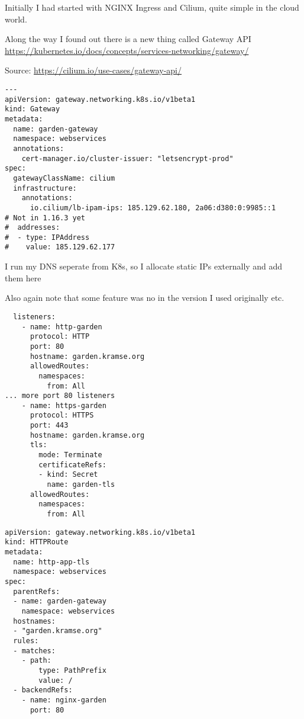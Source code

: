 \documentclass[Screen16to9,17pt]{foils}
\begin{document}

Initially I had started with NGINX Ingress and Cilium, quite simple in the cloud world.


Along the way I found out there is a new thing called Gateway API\\
 \url{https://kubernetes.io/docs/concepts/services-networking/gateway/}

Source: \url{https://cilium.io/use-cases/gateway-api/}

\begin{verbatim}
---
apiVersion: gateway.networking.k8s.io/v1beta1
kind: Gateway
metadata:
  name: garden-gateway
  namespace: webservices
  annotations:
    cert-manager.io/cluster-issuer: "letsencrypt-prod"
spec:
  gatewayClassName: cilium
  infrastructure:
    annotations:
      io.cilium/lb-ipam-ips: 185.129.62.180, 2a06:d380:0:9985::1
# Not in 1.16.3 yet
#  addresses:
#  - type: IPAddress
#    value: 185.129.62.177
\end{verbatim}

\begin{list2}
\item I run my DNS seperate from K8s, so I allocate static IPs externally and add them here
\item Also again note that some feature was no in the version I used originally etc.
\end{list2}

\begin{verbatim}
  listeners:
    - name: http-garden
      protocol: HTTP
      port: 80
      hostname: garden.kramse.org
      allowedRoutes:
        namespaces:
          from: All
... more port 80 listeners
    - name: https-garden
      protocol: HTTPS
      port: 443
      hostname: garden.kramse.org
      tls:
        mode: Terminate
        certificateRefs:
        - kind: Secret
          name: garden-tls
      allowedRoutes:
        namespaces:
          from: All
\end{verbatim}




\begin{verbatim}
apiVersion: gateway.networking.k8s.io/v1beta1
kind: HTTPRoute
metadata:
  name: http-app-tls
  namespace: webservices
spec:
  parentRefs:
  - name: garden-gateway
    namespace: webservices
  hostnames:
  - "garden.kramse.org"
  rules:
  - matches:
    - path:
        type: PathPrefix
        value: /
  - backendRefs:
    - name: nginx-garden
      port: 80
\end{verbatim}
\end{document}
